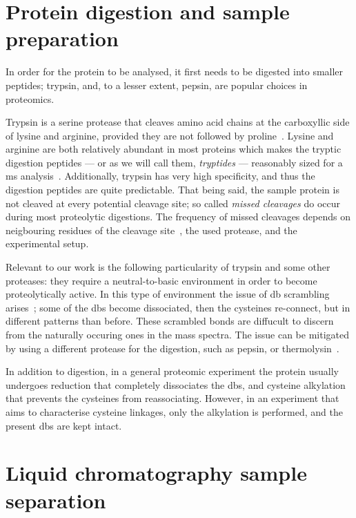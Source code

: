 \section{Protein digestion and sample preparation}\label{sec:trypsin}

In order for the protein to be analysed, it first needs to be digested into smaller peptides; trypsin, and, to a lesser extent, pepsin, are popular choices in proteomics.

Trypsin is a serine protease that cleaves amino acid chains at the carboxyllic side of lysine and arginine, provided they are not followed by proline~\cite{olsen2004trypsin}. Lysine and arginine are both relatively abundant in most proteins which makes the tryptic digestion peptides --- or as we will call them, \emph{tryptides} --- reasonably sized for a \gls*{ms} analysis~\cite{matthiesen2007mass}. Additionally, trypsin has very high specificity, and thus the digestion peptides are quite predictable. That being said, the sample protein is not cleaved at every potential cleavage site; so called \emph{missed cleavages} do occur during most proteolytic digestions. The frequency of missed cleavages depends on neigbouring residues of the cleavage site~\cite{gershon2014cleaved}, the used protease, and the experimental setup.

Relevant to our work is the following particularity of trypsin and some other proteases: they require a neutral-to-basic environment in order to become proteolytically active. In this type of environment the issue of \gls*{db} scrambling arises~\cite{wu1997novel}; some of the \glspl*{db} become dissociated, then the cysteines re-connect, but in different patterns than before. These scrambled bonds are diffucult to discern from the naturally occuring ones in the mass spectra. The issue can be mitigated by using a different protease for the digestion, such as pepsin, or thermolysin~\cite{sung2016evaluation}.

In addition to digestion, in a general proteomic experiment the protein usually undergoes reduction that completely dissociates the \glspl*{db}, and cysteine alkylation that prevents the cysteines from reassociating. However, in an experiment that aims to characterise cysteine linkages, only the alkylation is performed, and the present \glspl*{db} are kept intact.

\section{Liquid chromatography sample separation}\label{sec:lc}

